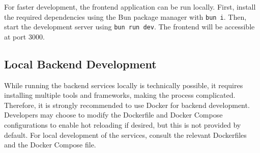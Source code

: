 For faster development, the frontend application can be run locally. First, install the required dependencies using the Bun package manager with \lstinline|bun i|. Then, start the development server using \lstinline|bun run dev|. The frontend will be accessible at port 3000.

\subsection{Local Backend Development}
\label{sec:local-backend-development}

While running the backend services locally is technically possible, it requires installing multiple tools and frameworks, making the process complicated. Therefore, it is strongly recommended to use Docker for backend development. Developers may choose to modify the Dockerfile and Docker Compose configurations to enable hot reloading if desired, but this is not provided by default. For local development of the services, consult the relevant Dockerfiles and the Docker Compose file.
